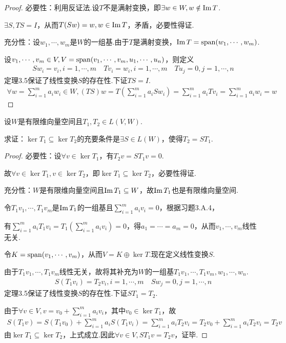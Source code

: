 \begin{proof}
    必要性：利用反证法.设\(T\)不是满射变换，即\(\exists w\in W,w\notin \operatorname{Im} T\).

    \(\exists S,TS=I\)，从而\(T(Sw)=w,w\in \operatorname{Im} T\)，矛盾，必要性得证.
    
    充分性：设\(w_1,\cdots,w_m\)是\(W\)的一组基.由于\(T\)是满射变换，\(\operatorname{Im} T=\operatorname{span} (w_1,\cdots,w_m)\).
    
    设\(v_1,\cdots,v_m\in V,V=\operatorname{span} (v_1,\cdots,v_m,u_1,\cdots,u_n)\)，则定义
    \begin{align*}
        Sw_i=v_i,i=1,\cdots,m \quad
        Tv_i=w_i,i=1,\cdots,m \quad Tu_j=0,j=1,\cdots,n
    \end{align*}
    定理3.5保证了线性变换\(S\)的存在性.下证\(TS=I\).
    \begin{align*}
        \forall w=\sum_{i=1}^m a_iw_i\in W,(TS)w=T(\sum_{i=1}^m a_iSw_i) 
        =\sum_{i=1}^m a_iTv_i=\sum_{i=1}^m a_iw_i=w
    \end{align*}
\end{proof}

\begin{problem}[24]\label{3.B.24}
    设\(W\)是有限维向量空间且\(T_1,T_2 \in L(V,W)\).

    求证：\(\ker T_1 \subseteq \ker T_2\)的充要条件是\(\exists S \in L(W)\)，使得\(T_2=ST_1\).        
\end{problem}

\begin{proof}
    必要性：设\(\forall v \in \ker T_1\)，有\(T_2v=ST_1v=0\).

    故\(\forall v \in \ker T_1, v \in \ker T_2\)，即\(\ker T_1 \subseteq \ker T_2\)，必要性得证.
    
    充分性：\(W\)是有限维向量空间且\(\operatorname{Im} T_1 \subseteq W\)，故\(\operatorname{Im} T_1\)也是有限维向量空间.
    
    令\(T_1v_1,\cdots,T_1v_m\)是\(\operatorname{Im} T_1\)的一组基且\(\sum_{i=1}^m a_iv_i=0\)，根据习题3.A.4，
    
    有\(\sum_{i=1}^m a_iT_1v_i=T_1(\sum_{i=1}^m a_iv_i)=0\)，得\(a_1=\cdots=a_m=0\)，从而\(v_1,\cdots,v_m\)线性无关.
    
    令\(K=\operatorname{span} (v_1,\cdots,v_m)\)，从而\(V=K \oplus \ker T\).现在定义线性变换\(S\).
    
    由于\(T_1v_1,\cdots,T_1v_m\)线性无关，故将其补充为\(W\)的一组基\(T_1v_1,\cdots,T_1v_m,w_1,\cdots,w_n\).
    \begin{align*}
        S(T_1v_i)=T_2v_i,i=1,\cdots,m \quad Sw_j=0,j=1,\cdots,n
    \end{align*}
    定理3.5保证了线性变换\(S\)的存在性.下证\(ST_1=T_2\).
    
    由于\(\forall v \in V, v=v_0+\sum_{i=1}^m a_iv_i\)，其中\(v_0 \in \ker T_1\)，故
    \begin{align*}
        S(T_1v)=S(T_1v_0)+\sum_{i=1}^m a_iS(T_1v_i)
        =\sum_{i=1}^m a_iT_2v_i=T_2v_0+\sum_{i=1}^m a_iT_2v_i=T_2v
    \end{align*}
    由\(\ker T_1 \subseteq \ker T_2\)，上式成立.因此\(\forall v \in V, ST_1v=T_2v\)，证毕.
\end{proof}

